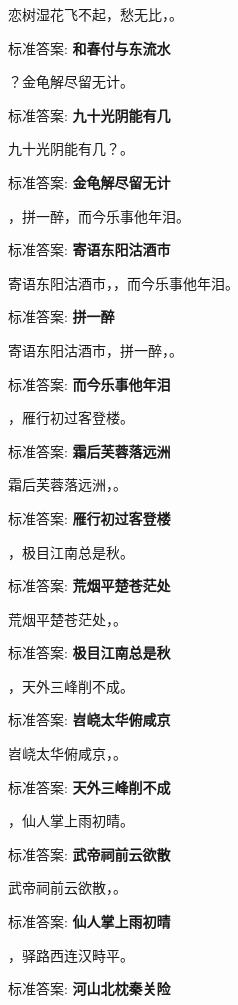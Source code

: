 \documentclass[12pt, a4paper, addpoints]{exam}
\begin{document}
\begin{questions}
\question[1] 恋树湿花飞不起，愁无比，\uline{\qquad\qquad\qquad}。

标准答案: \textbf{和春付与东流水}

\question[1] \uline{\qquad\qquad\qquad}？金龟解尽留无计。

标准答案: \textbf{九十光阴能有几}

\question[1] 九十光阴能有几？\uline{\qquad\qquad\qquad}。

标准答案: \textbf{金龟解尽留无计}

\question[1] \uline{\qquad\qquad\qquad}，拼一醉，而今乐事他年泪。

标准答案: \textbf{寄语东阳沽酒市}

\question[1] 寄语东阳沽酒市，\uline{\qquad\qquad\qquad}，而今乐事他年泪。

标准答案: \textbf{拼一醉}

\question[1] 寄语东阳沽酒市，拼一醉，\uline{\qquad\qquad\qquad}。

标准答案: \textbf{而今乐事他年泪}

\question[1] \uline{\qquad\qquad\qquad}，雁行初过客登楼。

标准答案: \textbf{霜后芙蓉落远洲}

\question[1] 霜后芙蓉落远洲，\uline{\qquad\qquad\qquad}。

标准答案: \textbf{雁行初过客登楼}

\question[1] \uline{\qquad\qquad\qquad}，极目江南总是秋。

标准答案: \textbf{荒烟平楚苍茫处}

\question[1] 荒烟平楚苍茫处，\uline{\qquad\qquad\qquad}。

标准答案: \textbf{极目江南总是秋}

\question[1] \uline{\qquad\qquad\qquad}，天外三峰削不成。

标准答案: \textbf{岧峣太华俯咸京}

\question[1] 岧峣太华俯咸京，\uline{\qquad\qquad\qquad}。

标准答案: \textbf{天外三峰削不成}

\question[1] \uline{\qquad\qquad\qquad}，仙人掌上雨初晴。

标准答案: \textbf{武帝祠前云欲散}

\question[1] 武帝祠前云欲散，\uline{\qquad\qquad\qquad}。

标准答案: \textbf{仙人掌上雨初晴}

\question[1] \uline{\qquad\qquad\qquad}，驿路西连汉畤平。

标准答案: \textbf{河山北枕秦关险}


\end{questions}
\end{document}

